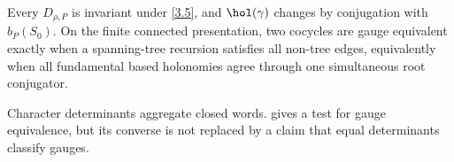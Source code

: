 \begin{proposition}
\label{prop:gauge}
Every $D_{\rho,P}$ is invariant under \eqref{3.5}, and
$\hol(\gamma)$ changes by conjugation with $b_P(S_0)$.  On the finite
connected presentation, two cocycles are gauge equivalent exactly when a
spanning-tree recursion satisfies all non-tree edges, equivalently when all
fundamental based holonomies agree through one simultaneous root
conjugator.
\end{proposition}

Character determinants aggregate closed words.   gives a
test for gauge equivalence, but its converse is not replaced by a claim that
equal determinants classify gauges.
